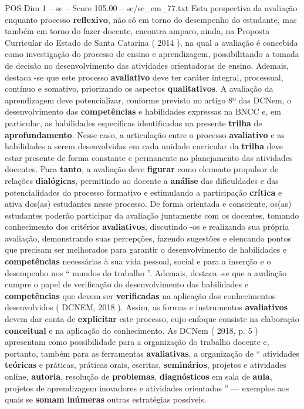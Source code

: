 \begin{textsample}{POS Dim 1 – sc – Score 105.00 – sc/sc\_em\_77.txt}
Esta perspectiva da avaliação enquanto processo \textbf{reflexivo}, não só em torno do desempenho do estudante, mas também em torno do fazer docente, encontra amparo, ainda, na Proposta Curricular do Estado de Santa Catarina ( 2014 ), na qual a avaliação é concebida como investigação do processo de ensino e aprendizagem, possibilitando a tomada de decisão no desenvolvimento das atividades orientadoras de ensino.
Ademais, destaca -se que este processo \textbf{avaliativo} deve ter caráter integral, processual, contínuo e somativo, priorizando os aspectos \textbf{qualitativos}.
A avaliação da aprendizagem deve potencializar, conforme previsto no artigo 8º das DCNem, o desenvolvimento das \textbf{competências} e habilidades expressas na BNCC e, em particular, as habilidades específicas identificadas na presente \textbf{trilha} de \textbf{aprofundamento}.
Nesse caso, a articulação entre o processo \textbf{avaliativo} e as habilidades a serem desenvolvidas em cada unidade curricular da \textbf{trilha} deve estar presente de forma constante e permanente no planejamento das atividades docentes.
Para \textbf{tanto}, a avaliação deve \textbf{figurar} como elemento propulsor de relações \textbf{dialógicas}, permitindo ao docente a \textbf{análise} das dificuldades e das potencialidades do processo formativo e estimulando a participação \textbf{crítica} e ativa dos(as) estudantes nesse processo.
De forma orientada e consciente, os(as) estudantes poderão participar da avaliação juntamente com os docentes, tomando conhecimento dos critérios \textbf{avaliativos}, discutindo -os e realizando sua própria avaliação, demonstrando suas percepções, fazendo sugestões e elencando pontos que precisam ser melhorados para garantir o desenvolvimento de habilidades e \textbf{competências} necessárias à sua vida pessoal, social e para a inserção e o desempenho nos “ mundos do trabalho ”.
Ademais, destaca -se que a avaliação cumpre o papel de verificação do desenvolvimento das habilidades e \textbf{competências} que devem ser \textbf{verificadas} na aplicação dos conhecimentos desenvolvidos ( DCNEM, 2018 ).
Assim, as formas e instrumentos \textbf{avaliativos} devem dar conta de \textbf{explicitar} este processo, cujo enfoque consiste na elaboração \textbf{conceitual} e na aplicação do conhecimento.
As DCNem ( 2018, p. 5 ) apresentam como possibilidade para a organização do trabalho docente e, portanto, também para as ferramentas \textbf{avaliativas}, a organização de “ atividades \textbf{teóricas} e práticas, práticas orais, escritas, \textbf{seminários}, projetos e atividades online, \textbf{autoria}, resolução de \textbf{problemas}, \textbf{diagnósticos} em sala de \textbf{aula}, projetos de aprendizagem inovadores e atividades orientadas ” — exemplos aos quais se \textbf{somam} \textbf{inúmeras} outras estratégias possíveis.

\end{textsample}
